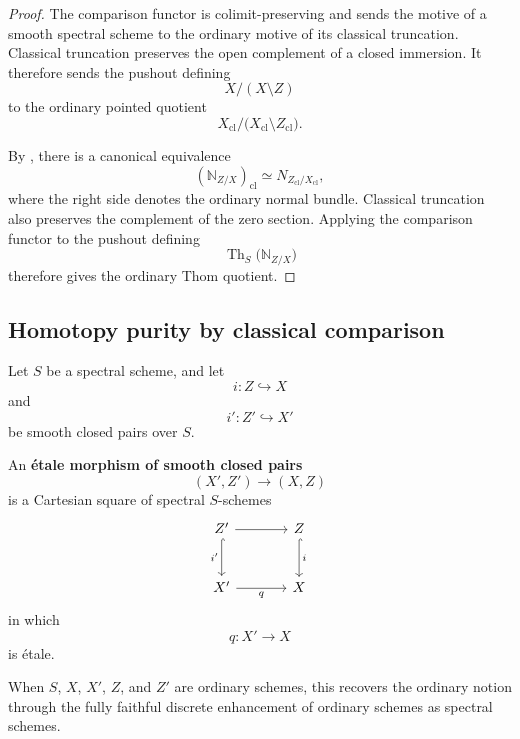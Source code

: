 \begin{proof}
The comparison functor is colimit-preserving and sends the motive of a
smooth spectral scheme to the ordinary motive of its classical
truncation.  Classical truncation preserves the open complement of a
closed immersion.  It therefore sends the pushout defining
\[
    X/(X\setminus Z)
\]
to the ordinary pointed quotient
\[
    X_{\mathrm{cl}}/
    \bigl(
        X_{\mathrm{cl}}\setminus Z_{\mathrm{cl}}
    \bigr).
\]

By
,
there is a canonical equivalence
\[
    (\mathbb N_{Z/X})_{\mathrm{cl}}
    \simeq
    N_{Z_{\mathrm{cl}}/X_{\mathrm{cl}}},
\]
where the right side denotes the ordinary normal bundle.  Classical
truncation also preserves the complement of the zero section.  Applying
the comparison functor to the pushout defining
\[
    \operatorname{Th}_S
    \bigl(
        \mathbb N_{Z/X}
    \bigr)
\]
therefore gives the ordinary Thom quotient.
\end{proof}

\subsection{Homotopy purity by classical comparison}


\begin{definition}
\label{def:etale-morphism-smooth-closed-pairs}
Let \(S\) be a spectral scheme, and let
\[
    i
    \colon
    Z
    \hookrightarrow
    X
\]
and
\[
    i'
    \colon
    Z'
    \hookrightarrow
    X'
\]
be smooth closed pairs over \(S\).

An \textbf{étale morphism of smooth closed pairs}
\[
    (X',Z')
    \longrightarrow
    (X,Z)
\]
is a Cartesian square of spectral \(S\)-schemes
\[
\begin{tikzcd}[column sep=large, row sep=large]
    Z'
        \arrow[r]
        \arrow[d, hook, "i'"']
    &
    Z
        \arrow[d, hook, "i"]
    \\
    X'
        \arrow[r, "q"']
    &
    X
\end{tikzcd}
\]
in which
\[
    q
    \colon
    X'
    \longrightarrow
    X
\]
is étale.

When \(S\), \(X\), \(X'\), \(Z\), and \(Z'\) are ordinary schemes,
this recovers the ordinary notion through the fully faithful discrete
enhancement of ordinary schemes as spectral schemes.
\end{definition}


